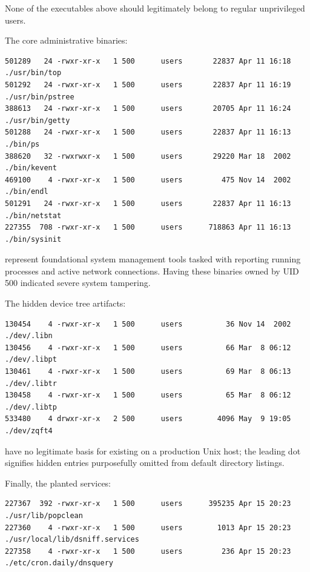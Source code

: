 \vspace{3mm}

None of the executables above should legitimately belong to regular unprivileged users. 

The core administrative binaries:

\vspace{1em}
\begin{lstlisting}[style=terminal]
501289   24 -rwxr-xr-x   1 500      users       22837 Apr 11 16:18 ./usr/bin/top
501292   24 -rwxr-xr-x   1 500      users       22837 Apr 11 16:19 ./usr/bin/pstree
388613   24 -rwxr-xr-x   1 500      users       20705 Apr 11 16:24 ./usr/bin/getty
501288   24 -rwxr-xr-x   1 500      users       22837 Apr 11 16:13 ./bin/ps
388620   32 -rwxrwxr-x   1 500      users       29220 Mar 18  2002 ./bin/kevent
469100    4 -rwxr-xr-x   1 500      users         475 Nov 14  2002 ./bin/endl
501291   24 -rwxr-xr-x   1 500      users       22837 Apr 11 16:13 ./bin/netstat
227355  708 -rwxr-xr-x   1 500      users      718863 Apr 11 16:13 ./bin/sysinit
\end{lstlisting}
\vspace{1em}

represent foundational system management tools tasked with reporting running processes and active network connections. Having these binaries owned by UID 500 indicated severe system tampering.

The hidden device tree artifacts:

\vspace{1em}
\begin{lstlisting}[style=terminal]
130454    4 -rwxr-xr-x   1 500      users          36 Nov 14  2002 ./dev/.libn
130456    4 -rwxr-xr-x   1 500      users          66 Mar  8 06:12 ./dev/.libpt
130461    4 -rwxr-xr-x   1 500      users          69 Mar  8 06:13 ./dev/.libtr
130458    4 -rwxr-xr-x   1 500      users          65 Mar  8 06:12 ./dev/.libtp
533480    4 drwxr-xr-x   2 500      users        4096 May  9 19:05 ./dev/zqft4
\end{lstlisting}
\vspace{1em}

have no legitimate basis for existing on a production Unix host; the leading dot signifies hidden entries purposefully omitted from default directory listings.

Finally, the planted services:

\vspace{1em}
\begin{lstlisting}[style=terminal]
227367  392 -rwxr-xr-x   1 500      users      395235 Apr 15 20:23 ./usr/lib/popclean
227360    4 -rwxr-xr-x   1 500      users        1013 Apr 15 20:23 ./usr/local/lib/dsniff.services
227358    4 -rwxr-xr-x   1 500      users         236 Apr 15 20:23 ./etc/cron.daily/dnsquery
\end{lstlisting}
\vspace{1em}


